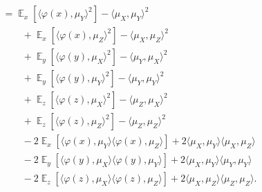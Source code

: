 \documentclass{article}
\DeclareMathOperator{\E}{\mathbb{E}}
\begin{document}
\begin{align*}
%
\\&=
     \E_{x}\left[ \langle \varphi(x), \mu_Y \rangle^2 \right]
   - \langle \mu_X, \mu_Y \rangle^2
\\&\qquad
   + \E_{x}\left[ \langle \varphi(x), \mu_Z \rangle^2 \right]
   - \langle \mu_X, \mu_Z \rangle^2
\\&\qquad
   + \E_{y}\left[ \langle \varphi(y), \mu_X \rangle^2 \right]
   - \langle \mu_Y, \mu_X \rangle^2
\\&\qquad
   + \E_{y}\left[ \langle \varphi(y), \mu_Y  \rangle^2 \right]
   - \langle \mu_Y, \mu_Y \rangle^2
\\&\qquad
   + \E_{z}\left[ \langle \varphi(z), \mu_X \rangle^2 \right]
   - \langle \mu_Z, \mu_X \rangle^2
\\&\qquad
   + \E_{z}\left[ \langle \varphi(z), \mu_Z \rangle^2 \right]
   - \langle \mu_Z, \mu_Z \rangle^2
\\&\qquad
   - 2 \E_x\left[ \langle \varphi(x), \mu_Y \rangle \langle \varphi(x), \mu_Z \rangle \right]
   + 2 \langle \mu_X, \mu_Y \rangle \langle \mu_X, \mu_Z \rangle
\\&\qquad
   - 2 \E_y\left[ \langle \varphi(y), \mu_X \rangle \langle \varphi(y), \mu_Y \rangle \right]
   + 2 \langle \mu_X, \mu_Y \rangle \langle \mu_Y, \mu_Y \rangle
\\&\qquad
   - 2 \E_z\left[ \langle \varphi(z), \mu_X \rangle \langle \varphi(z), \mu_Z \rangle \right]
   + 2 \langle \mu_X, \mu_Z \rangle \langle \mu_Z, \mu_Z \rangle
.\end{align*}
\end{document}
